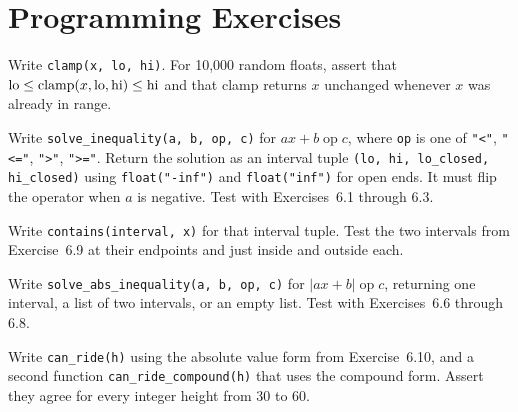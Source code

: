 \section{Programming Exercises}

\begin{codeexercises}
\item Write \lstinline!clamp(x, lo, hi)!. For 10{,}000 random floats, assert that $\text{lo} \le \operatorname{clamp}(x, \text{lo}, \text{hi}) \le \text{hi}$ and that clamp returns $x$ unchanged whenever $x$ was already in range.
\item Write \lstinline!solve_inequality(a, b, op, c)! for $ax + b \mathrel{\text{op}} c$, where \lstinline!op! is one of \lstinline!"<"!, \lstinline!"<="!, \lstinline!">"!, \lstinline!">="!. Return the solution as an interval tuple \lstinline!(lo, hi, lo_closed, hi_closed)! using \lstinline!float("-inf")! and \lstinline!float("inf")! for open ends. It must flip the operator when $a$ is negative. Test with Exercises~6.1 through 6.3.
\item Write \lstinline!contains(interval, x)! for that interval tuple. Test the two intervals from Exercise~6.9 at their endpoints and just inside and outside each.
\item Write \lstinline!solve_abs_inequality(a, b, op, c)! for $|ax + b| \mathrel{\text{op}} c$, returning one interval, a list of two intervals, or an empty list. Test with Exercises~6.6 through 6.8.
\item Write \lstinline!can_ride(h)! using the absolute value form from Exercise~6.10, and a second function \lstinline!can_ride_compound(h)! that uses the compound form. Assert they agree for every integer height from 30 to 60.
\end{codeexercises}
